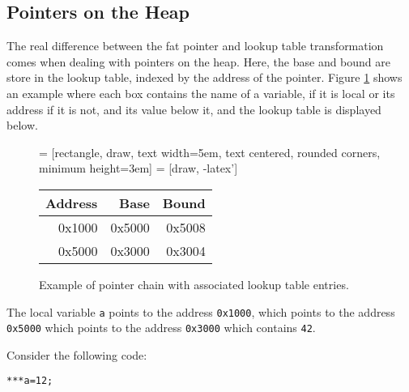 \subsection{Pointers on the Heap}

The real difference between the fat pointer and lookup table transformation comes when dealing with pointers on the heap.
Here, the base and bound are store in the lookup table, indexed by the address of the pointer.
Figure \ref{fig:PtrChain} shows an example where each box contains the name of a variable, if it is local or its address if it is not, and its value below it, and the lookup table is displayed below. 

\begin{figure}
\centering
{} = [rectangle, draw, 
    text width=5em, text centered, rounded corners, minimum height=3em]
     = [draw, -latex']
\newline
\vspace{5mm}
\newline
\begin{tabular}{|r|r|r|}
\hline Address & Base & Bound \\
\hline 0x1000 & 0x5000 & 0x5008 \\
\hline 0x5000 & 0x3000 & 0x3004 \\
\hline
\end{tabular}
\caption{Example of pointer chain with associated lookup table entries.}
\label{fig:PtrChain}
\end{figure}

The local variable \verb!a! points to the address \verb!0x1000!, which points to the address \verb!0x5000! which points to the address \verb!0x3000! which contains \verb!42!.

Consider the following code:

\begin{verbatim}
***a=12;
\end{verbatim}

